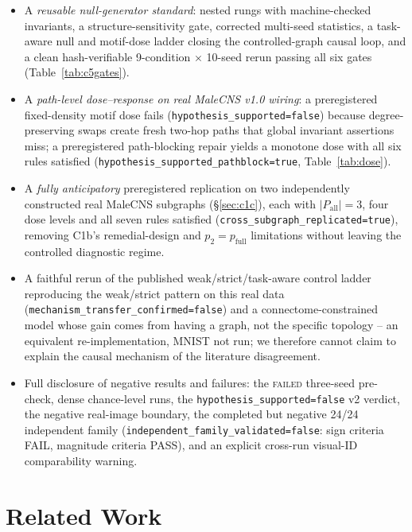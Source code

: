 \documentclass[10pt,twocolumn,letterpaper]{article}
\begin{document}
\begin{itemize}
\item A \emph{reusable null-generator standard}: nested rungs with
  machine-checked invariants, a structure-sensitivity gate, corrected
  multi-seed statistics, a task-aware null and motif-dose ladder closing the
  controlled-graph causal loop, and a clean hash-verifiable 9-condition
  $\times$ 10-seed rerun passing all six gates (Table~\ref{tab:c5gates}).
\item A \emph{path-level dose--response on real MaleCNS v1.0 wiring}: a
  preregistered fixed-density motif dose fails
  (\texttt{hypothesis\_supported=false}) because degree-preserving swaps
  create fresh two-hop paths that global invariant assertions miss; a
  preregistered path-blocking repair yields a monotone dose with all six
  rules satisfied (\texttt{hypothesis\_supported\_pathblock=true},
  Table~\ref{tab:dose}).
\item A \emph{fully anticipatory} preregistered replication on two
  independently constructed real MaleCNS subgraphs (\S\ref{sec:c1c}), each with
  $|P_{\mathrm{all}}|=3$, four dose levels and all seven rules satisfied
  (\texttt{cross\_subgraph\_replicated=true}), removing C1b's remedial-design
  and $p_2{=}p_{\mathrm{full}}$ limitations without leaving the controlled
  diagnostic regime.
\item A faithful rerun of the published weak/strict/task-aware control ladder
  reproducing the weak/strict pattern on this real data
  (\texttt{mechanism\_transfer\_confirmed=false}) and a connectome-constrained
  model whose gain comes from having a graph, not the specific topology -- an
  equivalent re-implementation, MNIST not run; we therefore cannot claim to
  explain the causal mechanism of the literature disagreement.
\item Full disclosure of negative results and failures: the \textsc{failed}
  three-seed pre-check, dense chance-level runs, the
  \texttt{hypothesis\_supported=false} v2 verdict, the negative real-image
  boundary, the completed but negative 24/24 independent family
  (\texttt{independent\_family\_validated=false}: sign criteria FAIL,
  magnitude criteria PASS), and an explicit cross-run visual-ID comparability
  warning.
\end{itemize}

\section{Related Work}
\label{sec:related}
\end{document}

